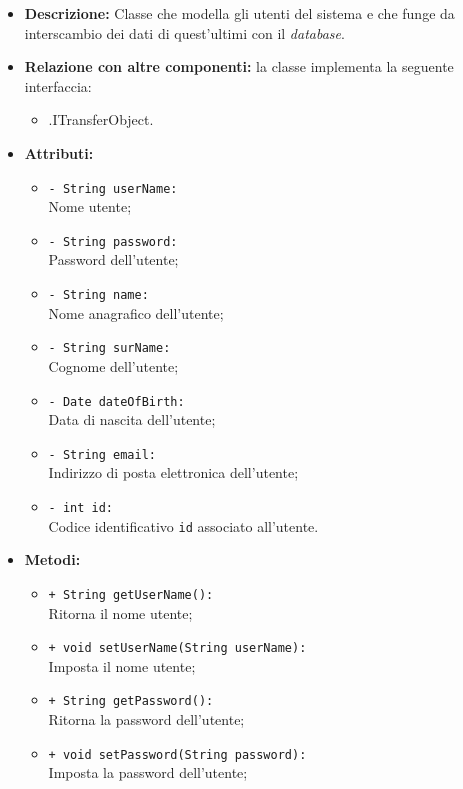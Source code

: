 \begin{flushleft}
\begin{itemize}
\item \textbf{Descrizione:} Classe che modella gli utenti del sistema e che funge da interscambio dei dati di quest'ultimi con il \textit{database}.
\item \textbf{Relazione con altre componenti:} la classe implementa la seguente interfaccia:
		\begin{itemize}
			\item \smodel{}.ITransferObject.
		\end{itemize}
\item \textbf{Attributi:}
\begin{sloppypar}
\begin{itemize}
\item \texttt{- String userName:}\\ Nome utente;
\item \texttt{- String password:}\\ Password dell'utente;
\item \texttt{- String name:}\\Nome anagrafico dell'utente;
\item \texttt{- String surName:}\\Cognome dell'utente;
\item \texttt{- Date dateOfBirth:}\\Data di nascita dell'utente;
\item \texttt{- String email:}\\Indirizzo di posta elettronica dell'utente;
\item \texttt{- int id:}\\Codice identificativo \texttt{id} associato all'utente.
\end{itemize}
\end{sloppypar}
\item \textbf{Metodi:}
\begin{sloppypar}
\begin{itemize}
\item \texttt{+ String getUserName():}\\ Ritorna il nome utente;
\item \texttt{+ void setUserName(String userName):}\\ Imposta il nome utente;
\item \texttt{+ String getPassword():}\\ Ritorna la password dell'utente;
\item \texttt{+ void setPassword(String password):}\\ Imposta la password dell'utente;

\end{itemize}
\end{sloppypar}
\end{itemize}
\end{flushleft}
